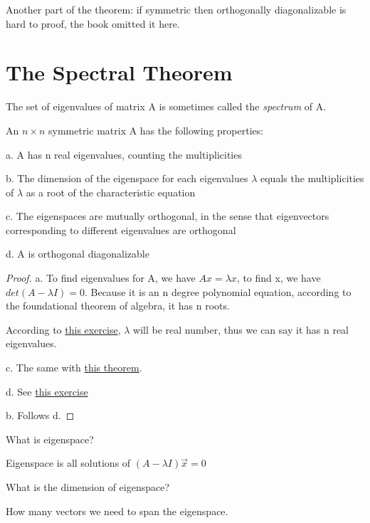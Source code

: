 Another part of the theorem: if symmetric then orthogonally diagonalizable is hard to proof, the book omitted it here.


\section{The Spectral Theorem}

The set of eigenvalues of matrix A is sometimes called the \textit{spectrum} of A.

\begin{theorem}
An \(n \times n\) symmetric matrix A has the following properties:

a. A has n real eigenvalues, counting the multiplicities

b. The dimension of the eigenspace for each eigenvalues \(\lambda \) equals the multiplicities of \(\lambda \) as a root of the characteristic equation

c. The eigenspaces are mutually orthogonal, in the sense that eigenvectors corresponding to different eigenvalues are orthogonal

d. A is orthogonal diagonalizable
\end{theorem}

\begin{proof}
    a. To find eigenvalues for A, we have \(Ax = \lambda x\), to find x, we have \(det(A - \lambda I)= 0\). Because it is an n degree polynomial equation, according to the foundational theorem of algebra, it has n roots.
    
    According to \hyperref[ex: 5.5.24]{this exercise}, \(\lambda\) will be real number, thus we can say it has n real eigenvalues. 

    c. The same with \hyperref[theorem: 7.1.1]{this theorem}.

    d. See \hyperref[ex: 7.1.31]{this exercise}

    b. Follows d.
\end{proof}

\begin{remark}
    What is eigenspace?

    Eigenspace is all solutions of \((A - \lambda I) \vec{x}  = 0\) 
\end{remark}


\begin{remark}
    What is the dimension of eigenspace?

    How many vectors we need to span the eigenspace.
\end{remark}

